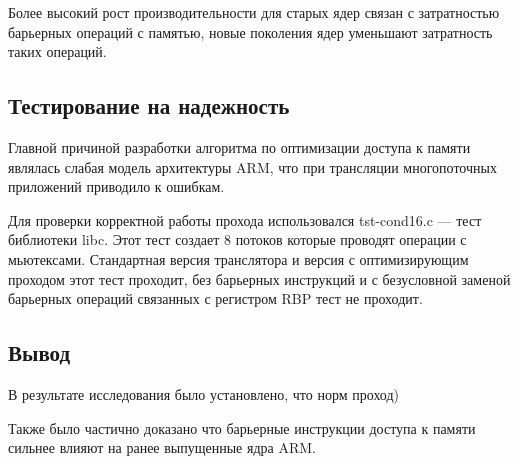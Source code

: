Более высокий рост производительности для старых ядер связан с затратностью барьерных операций с памятью, новые поколения ядер уменьшают затратность таких операций.

\subsection{Тестирование на надежность}

Главной причиной разработки алгоритма по оптимизации доступа к памяти являлась слабая модель архитектуры ARM, что при трансляции многопоточных приложений приводило к ошибкам.

Для проверки корректной работы прохода использовался tst-cond16.c --- тест библиотеки libc. Этот тест создает 8 потоков которые проводят операции с мьютексами. Стандартная версия транслятора и версия с оптимизирующим проходом этот тест проходит, без барьерных инструкций и с безусловной заменой барьерных операций связанных с регистром RBP тест не проходит.

\subsection{Вывод}

В результате исследования было установлено, что норм проход)

Также было частично доказано что барьерные инструкции доступа к памяти сильнее влияют на ранее выпущенные ядра ARM.
